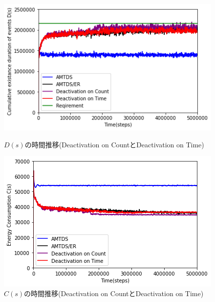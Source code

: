 \documentclass[12pt,a4j,twoside]{jarticle}
\begin{document}
  \begin{figure}
    \centering
    \includegraphics[width=0.9\hsize]{figures/ds_graph_3600_ave_CountTime_Office_600.png}
    \caption{$D(s)$の時間推移(Deactivation on CountとDeactivation on Time)}
    \label{fig:ds_CountTime}
    \vspace{12pt}
    \centering
    \includegraphics[width=0.9\hsize]{figures/cs_graph_3600_ave_CountTime_Office_600.png}
    \caption{$C(s)$の時間推移(Deactivation on CountとDeactivation on Time)}
    \label{fig:cs_CountTime}
  \end{figure}
\end{document}
